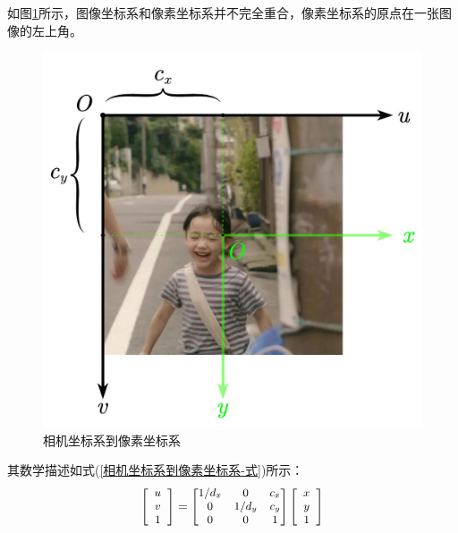 \documentclass{article}
\begin{document}
\begin{itemize}
		如图\ref{相机坐标系到像素坐标系-图}所示，图像坐标系和像素坐标系并不完全重合，像素坐标系的原点在一张图像的左上角。
		\begin{figure}[H]
			\begin{center}
				\includegraphics[scale=0.35]{相机坐标系到像素坐标系}
				\caption{相机坐标系到像素坐标系}
				\label{相机坐标系到像素坐标系-图}
			\end{center}
		\end{figure}
其数学描述如式(\ref{相机坐标系到像素坐标系-式})所示：
	\begin{equation}\label{相机坐标系到像素坐标系-式}
	\begin{aligned}
		{\small \left[ \begin{array}{c}
				u\\
				v\\
				1\\
			\end{array} \right] =\left[ \begin{matrix}
				1/d_x&		0&		c_x\\
				0&		1/d_y&		c_y\\
				0&		0&		1\\
			\end{matrix} \right] \left[ \begin{array}{c}
				x\\
				y\\
				1\\
			\end{array} \right]  }  	
	\end{aligned}	
\end{equation}


\end{itemize}
\end{document}
